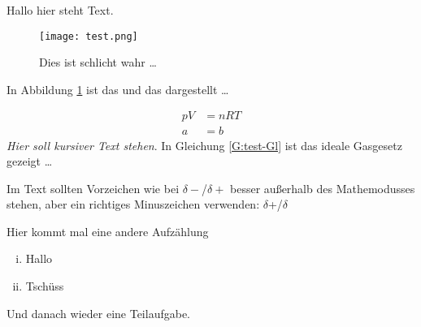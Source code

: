 \documentclass[./main.tex]{subfiles}
\begin{document}
\renewcommand{\tasktitle}{Allgemeine Chemie}
\renewcommand{\taskpoints}{3.5} %
\renewcommand{\taskweight}{8.7}
\aufgabenanfang

Hallo hier steht Text. \par

\blindtext
{}

\blindtext
{}

\blindtext

\begin{figure}[H]
\centering
\texttt{[image: test.png]}
\caption{Dies ist schlicht wahr \ldots }
\label{A:test-Abb}
\end{figure}

In Abbildung \ref{A:test-Abb} ist das und das dargestellt \ldots 

\begin{align}
    pV &= nRT \label{G:test-Gl}\\
    a &= b
\end{align}
\textit{Hier soll kursiver Text stehen}.
In Gleichung \ref{G:test-Gl} ist das ideale Gasgesetz gezeigt \ldots 

Im Text sollten Vorzeichen wie bei $\delta-$/$\delta+$ besser au\ss{}erhalb des Mathemodusses stehen, aber ein richtiges Minuszeichen verwenden: $\delta$+/$\delta$\textminus{}

Hier kommt mal eine andere Aufz\"ahlung
\begin{enumerate}[(i)]
    \item Hallo
    \item Tsch\"uss
\end{enumerate}
Und danach wieder eine Teilaufgabe.

\aufgabenende
\end{document}
